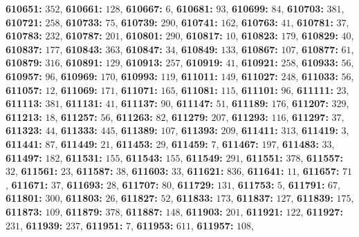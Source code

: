 \textsf{\bfseries 610651:} $352$, \textsf{\bfseries 610661:} $128$, \textsf{\bfseries 610667:} $6$, \textsf{\bfseries 610681:} $93$, \textsf{\bfseries 610699:} $84$, \textsf{\bfseries 610703:} $381$, \textsf{\bfseries 610721:} $258$, \textsf{\bfseries 610733:} $75$, \textsf{\bfseries 610739:} $290$, \textsf{\bfseries 610741:} $162$, \textsf{\bfseries 610763:} $41$, \textsf{\bfseries 610781:} $37$, \textsf{\bfseries 610783:} $232$, \textsf{\bfseries 610787:} $201$, \textsf{\bfseries 610801:} $290$, \textsf{\bfseries 610817:} $10$, \textsf{\bfseries 610823:} $179$, \textsf{\bfseries 610829:} $40$, \textsf{\bfseries 610837:} $177$, \textsf{\bfseries 610843:} $363$, \textsf{\bfseries 610847:} $34$, \textsf{\bfseries 610849:} $133$, \textsf{\bfseries 610867:} $107$, \textsf{\bfseries 610877:} $61$, \textsf{\bfseries 610879:} $316$, \textsf{\bfseries 610891:} $129$, \textsf{\bfseries 610913:} $257$, \textsf{\bfseries 610919:} $41$, \textsf{\bfseries 610921:} $258$, \textsf{\bfseries 610933:} $56$, \textsf{\bfseries 610957:} $96$, \textsf{\bfseries 610969:} $170$, \textsf{\bfseries 610993:} $119$, \textsf{\bfseries 611011:} $149$, \textsf{\bfseries 611027:} $248$, \textsf{\bfseries 611033:} $56$, \textsf{\bfseries 611057:} $12$, \textsf{\bfseries 611069:} $171$, \textsf{\bfseries 611071:} $165$, \textsf{\bfseries 611081:} $115$, \textsf{\bfseries 611101:} $96$, \textsf{\bfseries 611111:} $23$, \textsf{\bfseries 611113:} $381$, \textsf{\bfseries 611131:} $41$, \textsf{\bfseries 611137:} $90$, \textsf{\bfseries 611147:} $51$, \textsf{\bfseries 611189:} $176$, \textsf{\bfseries 611207:} $329$, \textsf{\bfseries 611213:} $18$, \textsf{\bfseries 611257:} $56$, \textsf{\bfseries 611263:} $82$, \textsf{\bfseries 611279:} $207$, \textsf{\bfseries 611293:} $116$, \textsf{\bfseries 611297:} $37$, \textsf{\bfseries 611323:} $44$, \textsf{\bfseries 611333:} $445$, \textsf{\bfseries 611389:} $107$, \textsf{\bfseries 611393:} $209$, \textsf{\bfseries 611411:} $313$, \textsf{\bfseries 611419:} $3$, \textsf{\bfseries 611441:} $87$, \textsf{\bfseries 611449:} $21$, \textsf{\bfseries 611453:} $29$, \textsf{\bfseries 611459:} $7$, \textsf{\bfseries 611467:} $197$, \textsf{\bfseries 611483:} $33$, \textsf{\bfseries 611497:} $182$, \textsf{\bfseries 611531:} $155$, \textsf{\bfseries 611543:} $155$, \textsf{\bfseries 611549:} $291$, \textsf{\bfseries 611551:} $378$, \textsf{\bfseries 611557:} $32$, \textsf{\bfseries 611561:} $23$, \textsf{\bfseries 611587:} $38$, \textsf{\bfseries 611603:} $33$, \textsf{\bfseries 611621:} $836$, \textsf{\bfseries 611641:} $11$, \textsf{\bfseries 611657:} $71$, \textsf{\bfseries 611671:} $37$, \textsf{\bfseries 611693:} $28$, \textsf{\bfseries 611707:} $80$, \textsf{\bfseries 611729:} $131$, \textsf{\bfseries 611753:} $5$, \textsf{\bfseries 611791:} $67$, \textsf{\bfseries 611801:} $300$, \textsf{\bfseries 611803:} $26$, \textsf{\bfseries 611827:} $52$, \textsf{\bfseries 611833:} $173$, \textsf{\bfseries 611837:} $127$, \textsf{\bfseries 611839:} $175$, \textsf{\bfseries 611873:} $109$, \textsf{\bfseries 611879:} $378$, \textsf{\bfseries 611887:} $148$, \textsf{\bfseries 611903:} $201$, \textsf{\bfseries 611921:} $122$, \textsf{\bfseries 611927:} $231$, \textsf{\bfseries 611939:} $237$, \textsf{\bfseries 611951:} $7$, \textsf{\bfseries 611953:} $611$, \textsf{\bfseries 611957:} $108$, 
